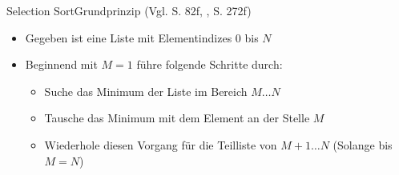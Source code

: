 \begin{frame}{Selection Sort}{Grundprinzip (Vgl. \cite{ottmann2017} S. 82f, \cite{wayne2014}, S. 272f)}
    \begin{itemize}
        \item Gegeben ist eine Liste mit Elementindizes $0$ bis $N$
        \item Beginnend mit $M=1$ führe folgende Schritte durch:
        \begin{itemize}
            \item Suche das Minimum der Liste im Bereich $M\ldots N$
            \item Tausche das Minimum mit dem Element an der Stelle $M$
            \item Wiederhole diesen Vorgang für die Teilliste von $M+1\ldots N$ (Solange bis $M=N$)
        \end{itemize}
    \end{itemize}
\end{frame}
